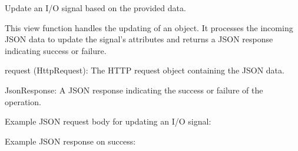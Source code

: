 \documentclass[letterpaper,10pt,english]{sphinxmanual}
\begin{document}
\begin{fulllineitems}
\label{\detokenize{app:app.views.update_iosignal}}
\pysigstartsignatures
{}
\pysigstopsignatures
\sphinxAtStartPar
Update an I/O signal based on the provided data.

\sphinxAtStartPar
This view function handles the updating of an  object. 
It processes the incoming JSON data to update the signal’s attributes and returns a 
JSON response indicating success or failure.
\begin{description}
\sphinxAtStartPar
request (HttpRequest): The HTTP request object containing the JSON data.

\sphinxAtStartPar
JsonResponse: A JSON response indicating the success or failure of the operation.

\sphinxAtStartPar
Example JSON request body for updating an I/O signal:

\begin{sphinxVerbatim}[commandchars=\\\{\}]
\end{sphinxVerbatim}

\sphinxAtStartPar
Example JSON response on success:

\begin{sphinxVerbatim}[commandchars=\\\{\}]
\end{sphinxVerbatim}


\end{description}
\end{fulllineitems}
\end{document}
